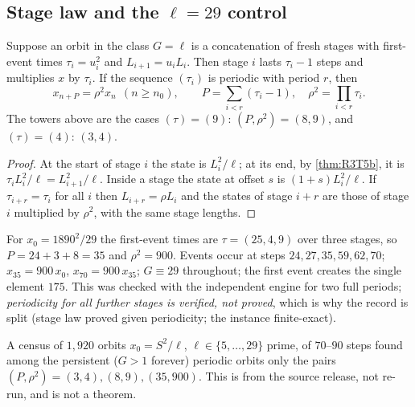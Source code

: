 \subsection{Stage law and the \texorpdfstring{$\ell=29$}{l=29} control}
\begin{theorem}\label{thm:R3T5d}
Suppose an orbit in the class $G=\ell$ is a concatenation of fresh stages with first-event times $\tau_i=u_i^2$ and $L_{i+1}=u_iL_i$. Then stage $i$ lasts $\tau_i-1$ steps and multiplies $x$ by $\tau_i$. If the sequence $(\tau_i)$ is periodic with period $r$, then
\[
x_{n+P}=\rho^2x_n\ \ (n\ge n_0),\qquad P=\sum_{i<r}(\tau_i-1),\quad\rho^2=\prod_{i<r}\tau_i .
\]
The towers above are the cases $(\tau)=(9)$: $(P,\rho^2)=(8,9)$, and $(\tau)=(4)$: $(3,4)$.
\end{theorem}
\begin{proof}
At the start of stage $i$ the state is $L_i^2/\ell$; at its end, by \cref{thm:R3T5b}, it is $\tau_iL_i^2/\ell=L_{i+1}^2/\ell$. Inside a stage the state at offset $s$ is $(1+s)L_i^2/\ell$. If $\tau_{i+r}=\tau_i$ for all $i$ then $L_{i+r}=\rho L_i$ and the states of stage $i+r$ are those of stage $i$ multiplied by $\rho^2$, with the same stage lengths. \qedhere
\end{proof}
\begin{example}[$\ell=29$, $S=1890$; finite-exact]\label{ex:l29}
For $x_0=1890^2/29$ the first-event times are $\tau=(25,4,9)$ over three stages, so $P=24+3+8=35$ and $\rho^2=900$. Events occur at steps $24,27,35,59,62,70$; $x_{35}=900\,x_0$, $x_{70}=900\,x_{35}$; $G\equiv29$ throughout; the first event creates the single element $175$. This was checked with the independent engine for two full periods; \emph{periodicity for all further stages is verified, not proved}, which is why the record is split (stage law proved given periodicity; the instance finite-exact).
\end{example}
\begin{remark}
A census of $1{,}920$ orbits $x_0=S^2/\ell$, $\ell\in\{5,\dots,29\}$ prime, of $70$--$90$ steps found among the persistent ($G>1$ forever) periodic orbits only the pairs $(P,\rho^2)=(3,4),(8,9),(35,900)$. This is  from the source release, not re-run, and is not a theorem.
\end{remark}
